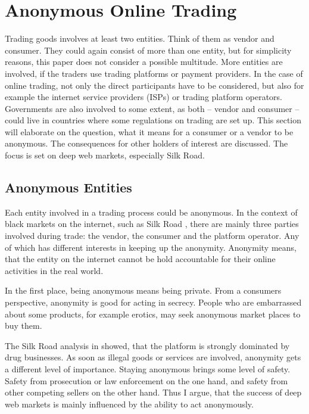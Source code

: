 \section{Anonymous Online Trading}
\label{trading}

Trading goods involves at least two entities. Think of them as vendor and consumer. They could again consist of more than one entity, but for simplicity reasons, this paper does not consider a possible multitude. More entities are involved, if the traders use trading platforms or payment providers. In the case of online trading, not only the direct participants have to be considered, but also for example the internet service providers (ISPs) or trading platform operators. Governments are also involved to some extent, as both -- vendor and consumer -- could live in countries where some regulations on trading are set up.
This section will elaborate on the question, what it means for a consumer or a vendor to be anonymous. The consequences for other holders of interest are discussed. The focus is set on deep web markets, especially Silk Road.

\subsection{Anonymous Entities}

Each entity involved in a trading process could be anonymous. In the context of black markets on the internet, such as Silk Road \cite{silkroad2013}, there are mainly three parties involved during trade: the vendor, the consumer and the platform operator. Any of which has different interests in keeping up the anonymity. Anonymity means, that the entity on the internet cannot be hold accountable for their online activities in the real world\cite{accountability2014}.

In the first place, being anonymous means being private. From a consumers perspective, anonymity is good for acting in secrecy. People who are embarrassed about some products, for example erotics, may seek anonymous market places to buy them.

The Silk Road analysis in \cite{silkroad2013} showed, that the platform is strongly dominated by drug businesses. As soon as illegal goods or services are involved, anonymity gets a different level of importance. Staying anonymous brings some level of safety. Safety from prosecution or law enforcement on the one hand, and safety from other competing sellers on the other hand. Thus I argue, that the success of deep web markets is mainly influenced by the ability to act anonymously.



